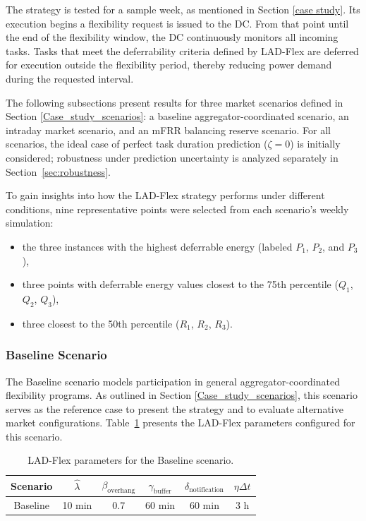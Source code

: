 \documentclass[preprint,12pt]{elsarticle}
\begin{document}
The strategy is tested for a sample week, as mentioned in Section \ref{case study}. Its execution begins a flexibility request is issued to the DC. From that point until the end of the flexibility window, the DC continuously monitors all incoming tasks. Tasks that meet the deferrability criteria defined by LAD-Flex are deferred for execution outside the flexibility period, thereby reducing power demand during the requested interval.

The following subsections present results for three market scenarios defined in Section \ref{Case_study_scenarios}: a baseline aggregator-coordinated scenario, an intraday market scenario, and an mFRR balancing reserve scenario. For all scenarios, the ideal case of perfect task duration prediction ($\zeta = 0$) is initially considered; robustness under prediction uncertainty is analyzed separately in Section~\ref{sec:robustness}.

To gain insights into how the LAD-Flex strategy performs under different conditions, nine representative points were selected from each scenario's weekly simulation:
\begin{itemize}
    \item the three instances with the highest deferrable energy (labeled $P_1$, $P_2$, and $P_3$),
    \item three points with deferrable energy values closest to the 75th percentile ($Q_1$, $Q_2$, $Q_3$),
    \item three closest to the 50th percentile ($R_1$, $R_2$, $R_3$).
\end{itemize}

\subsubsection{Baseline Scenario} \label{baseline_scenario}

The Baseline scenario models participation in general aggregator-coordinated flexibility programs. As outlined in Section \ref{Case_study_scenarios}, this scenario serves as the reference case to present the strategy and to evaluate alternative market configurations. Table~\ref{tab:parameters_baseline} presents the LAD-Flex parameters configured for this scenario.

\begin{table}[h!]
\centering
\begin{tabular}{@{}cccccc@{}}
\toprule
\textbf{Scenario} & $\hat{\lambda}$ & $\beta_\text{overhang}$ & $\gamma_{\text{buffer}}$ & $\delta_{\text{notification}}$ & $\eta{\Delta t}$ \\ \midrule
Baseline & 10 min & 0.7 & 60 min & 60 min & 3 h \\ \bottomrule
\end{tabular}
\caption{LAD-Flex parameters for the Baseline scenario.}
\label{tab:parameters_baseline}
\end{table}
\end{document}

